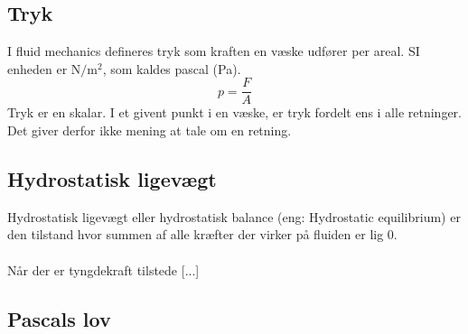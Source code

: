 \documentclass[a4paper, 11pt]{article}
\begin{document}
\subsection*{Tryk}
I fluid mechanics defineres tryk som kraften en væske udfører per areal. SI enheden er \(\text{N}/\text{m}^2\), som kaldes pascal (Pa).
\begin{equation}
    \label{tryk}
    p=\frac{F}{A}
\end{equation}
Tryk er en skalar. I et givent punkt i en væske, er tryk fordelt ens i alle retninger. Det giver derfor ikke mening at tale om en retning. 
\subsection*{Hydrostatisk ligevægt}
Hydrostatisk ligevægt eller hydrostatisk balance (eng: Hydrostatic equilibrium) er den tilstand hvor summen af alle kræfter der virker på fluiden er lig 0.\\\\
Når der er tyngdekraft tilstede [...]
\subsection*{Pascals lov}
\end{document}
